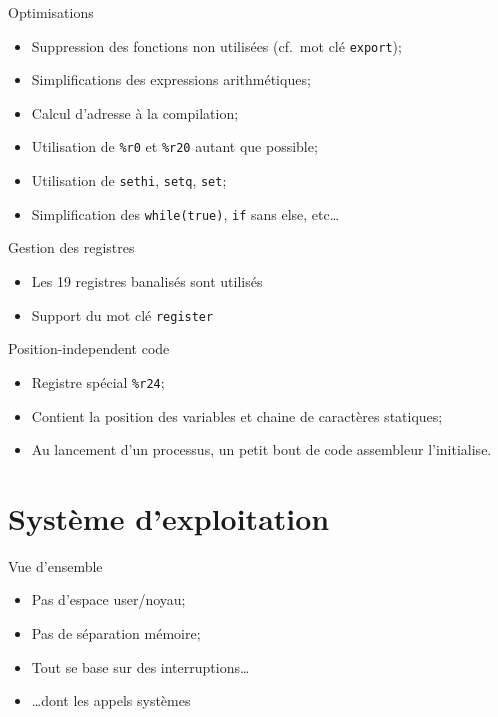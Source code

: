 \documentclass{beamer}
\begin{document}
    \begin{frame}[fragile]{Optimisations}
      \begin{itemize}
        \item Suppression des fonctions non utilisées (cf.\ mot clé
          \verb+export+);
        \item Simplifications des expressions arithmétiques;
        \item Calcul d'adresse à la compilation;
        \item Utilisation de \verb+%r0+ et \verb+%r20+ autant que possible;
        \item Utilisation de \verb+sethi+, \verb+setq+, \verb+set+;
        \item Simplification des \verb+while(true)+, \verb+if+ sans else, etc…
      \end{itemize}
\end{frame}

    \begin{frame}[fragile]{Gestion des registres}
      \begin{itemize}
        \item Les 19 registres banalisés sont utilisés
        \item Support du mot clé \verb+register+
      \end{itemize}
\end{frame}

  \begin{frame}[fragile]{Position-independent code}
    \begin{itemize}
      \item Registre spécial \verb+%r24+;
      \item Contient la position des variables et chaine de caractères
        statiques;
      \item Au lancement d'un processus, un petit bout de code assembleur
        l'initialise.
    \end{itemize}
\end{frame}

  \section{Système d'exploitation}
    \begin{frame}[fragile]{Vue d'ensemble}
      \begin{itemize}
        \item Pas d'espace user/noyau;
        \item Pas de séparation mémoire;
        \item Tout se base sur des interruptions\dots
        \item \dots dont les appels systèmes
      \end{itemize}
\end{frame}
\end{document}
